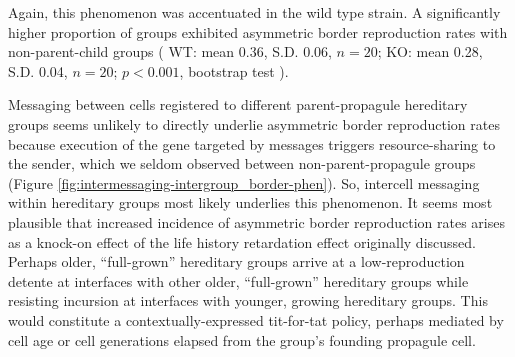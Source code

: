Again, this phenomenon was accentuated in the wild type strain.
A significantly higher proportion of groups exhibited asymmetric border reproduction rates with non-parent-child groups
(%
WT: mean 0.36, S.D. 0.06, $n=20$;
KO: mean 0.28, S.D. 0.04, $n=20$;
$p < 0.001$, bootstrap test%
). %

Messaging between cells registered to different parent-propagule hereditary groups seems unlikely to directly underlie asymmetric border reproduction rates because execution of the gene targeted by messages triggers resource-sharing to the sender, which we seldom observed between non-parent-propagule groups (Figure \ref{fig:intermessaging-intergroup_border-phen}).
So, intercell messaging within hereditary groups most likely underlies this phenomenon.
It seems most plausible that increased incidence of asymmetric border reproduction rates arises as a knock-on effect of the life history retardation effect originally discussed.
Perhaps older, ``full-grown'' hereditary groups arrive at a low-reproduction detente at interfaces with other older, ``full-grown'' hereditary groups while resisting incursion at interfaces with younger, growing hereditary groups.
This would constitute a contextually-expressed tit-for-tat policy, perhaps mediated by cell age or cell generations elapsed from the group's founding propagule cell.
